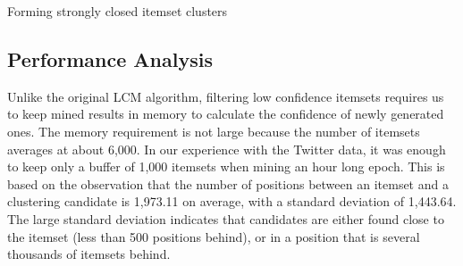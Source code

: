 \documentclass{sig-alternate}
\begin{document}
\begin{algorithm}[t]
\SetAlgoLined
\LinesNumbered
{} 
\;
\caption{Forming strongly closed itemset clusters}
\label{algo:alliance}
\end{algorithm}



\subsection{Performance Analysis}
\label{sec:bounding}



Unlike the original LCM algorithm, filtering low confidence itemsets requires
us to keep mined results in memory to calculate the confidence of newly
generated ones.
The memory requirement is not large because the number of itemsets 
averages at about 6,000.
In our experience with the Twitter data, it was enough to keep only a buffer
of 1,000 itemsets when mining an hour long epoch.
This is based on the observation that the number of positions 
between an itemset and a clustering candidate 
is 1,973.11 on average, with a standard deviation of 1,443.64. 
The large standard deviation indicates that
candidates are either found close to the itemset
(less than 500 positions behind),
or in a position that is several thousands 
of itemsets behind. 
\end{document}
